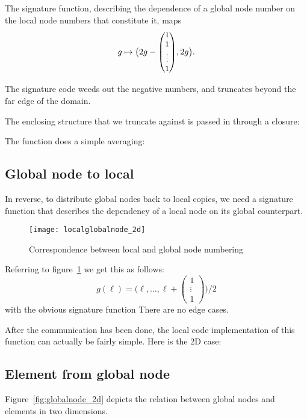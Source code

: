 \documentclass[11pt,fleqn,preprint]{impreport}
\begin{document}
The signature function, describing the dependence of a global node
number on the local node numbers that constitute it,
maps
\[ g\mapsto \bigl( 2g-
{\small \begin{pmatrix}
  1\\ 1\\ \vdots\\ 1
\end{pmatrix}}
,2g \bigr). \]

The signature code weeds out the negative numbers, and
truncates beyond the far edge of the domain.
%

\vfill\pagebreak

The enclosing structure that we truncate against is passed in through
a closure:
%

The function does a simple averaging:
%

\pagebreak
\subsection{Global node to local}
%
In reverse, to distribute global nodes back to local copies, we need a
signature function that describes the dependency of a local node on
its global counterpart.
%
\begin{figure}[ht]
  \texttt{[image: localglobalnode\_2d]}
  \caption{Correspondence between local and global node numbering}
  \label{fig:globallocal2d}
\end{figure}
%
Referring to figure~\ref{fig:globallocal2d} we get this as follows:
\[ g(\ell) = \bigl( \ell,\ldots,\ell+
   {\scriptstyle \begin{pmatrix} 1\\ \vdots\\ 1 \end{pmatrix}}
   \bigr)/2
\]
with the obvious signature function
%
%
There are no edge cases.

\pagebreak
After the communication has been done, the local code implementation
of this function can actually be fairly simple. Here is the 2D case:
%

\pagebreak
\subsection{Element from global node}

Figure~\ref{fig:globalnode_2d} depicts the relation between global
nodes and elements in two dimensions.
\end{document}
